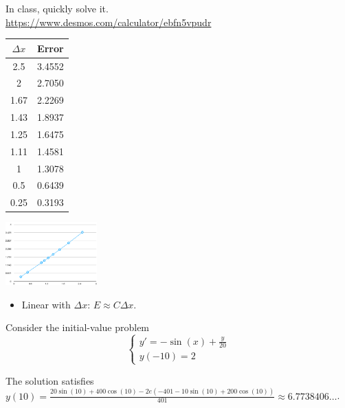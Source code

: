 

\begin{annotation}
	\begin{goals}
		
		In class, quickly solve it. \\

		\url{https://www.desmos.com/calculator/ebfn5vpudr}
		
		\begin{center}
		\begin{tabular}{c|c}
			$\Delta x$ & Error \\ \hline
			2.5&3.4552 \\
			2&2.7050 \\
			1.67&2.2269 \\
			1.43&1.8937 \\
			1.25&1.6475 \\
			1.11&1.4581 \\
			1&1.3078 \\
			0.5&0.6439 \\
			0.25&0.3193 \\
		\end{tabular}
		
		\includegraphics*[width=100pt]{images/module10-euler-error.pdf}
		\end{center}

		\begin{itemize}
			\item Linear with $\Delta x$: \quad $ E \approx C \Delta x$.
		\end{itemize}
	\end{goals}
\end{annotation}		

\question \label{approx:preclass}
	Consider the initial-value problem
	$$
	\begin{cases}
		y' = -\sin(x)+\frac{y}{20} \\
		y(-10)=2
	\end{cases}
	$$

	The solution satisfies $y(10)=\frac{20\sin(10)+400\cos(10)-2e(-401-10\sin(10)+200\cos(10))}{401} \approx 6.7738406\ldots$.

